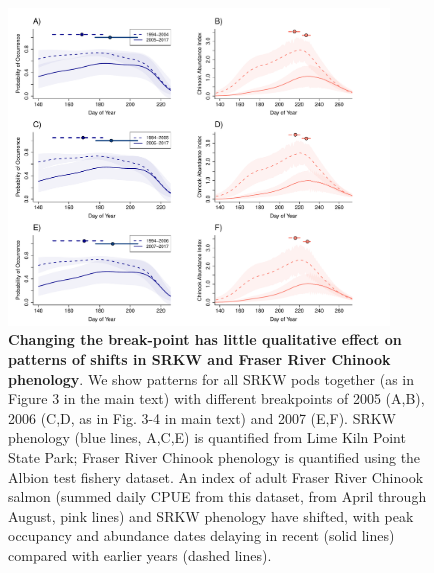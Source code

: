 \documentclass{article}
\begin{document}
\newpage
\begin{figure}[!hp]
\includegraphics[width=0.9\textwidth]{../analyses/orcaphen/figures/orcachinphenoverlapbrmsSRallbrkyears.pdf}
\caption{\textbf{Changing the break-point has little qualitative effect on patterns of shifts in SRKW and Fraser River Chinook phenology}. We show patterns for all SRKW pods together (as in Figure 3 in the main text) with different breakpoints of 2005 (A,B), 2006 (C,D, as in Fig. 3-4 in main text) and 2007 (E,F). SRKW phenology (blue lines, A,C,E) is quantified from Lime Kiln Point State Park; Fraser River Chinook phenology is quantified using the Albion test fishery dataset. An index of adult Fraser River Chinook salmon (summed daily CPUE from this dataset, from April through August, pink lines) and SRKW phenology have shifted, with peak occupancy and abundance dates delaying in recent (solid lines) compared with earlier years (dashed lines).}
\label{fig:brkpt}
\end{figure}
\end{document}
